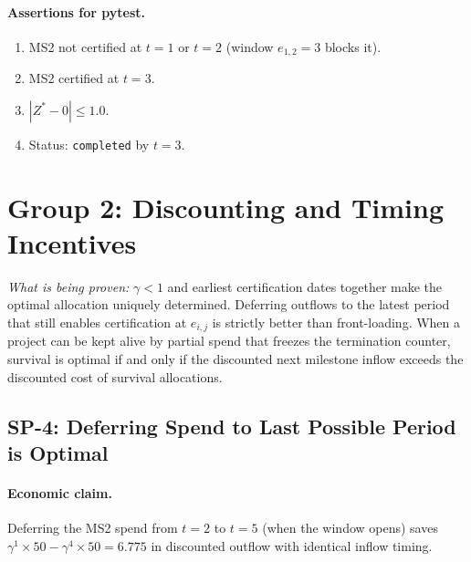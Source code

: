 \paragraph{Assertions for pytest.}
\begin{enumerate}[label=A\arabic*.]
  \item MS2 not certified at $t=1$ or $t=2$ (window $e_{1,2}=3$ blocks it).
  \item MS2 certified at $t=3$.
  \item $|Z^*-0|\leq1.0$.
  \item Status: \texttt{completed} by $t=3$.
\end{enumerate}

\section{Group 2: Discounting and Timing Incentives}

\textit{What is being proven:} $\gamma<1$ and earliest certification dates
together make the optimal allocation uniquely determined. Deferring
outflows to the latest period that still enables certification at
$e_{i,j}$ is strictly better than front-loading. When a project can
be kept alive by partial spend that freezes the termination counter,
survival is optimal if and only if the discounted next milestone inflow
exceeds the discounted cost of survival allocations.

\subsection{SP-4: Deferring Spend to Last Possible Period is Optimal}

\paragraph{Economic claim.}
Deferring the MS2 spend from $t=2$ to $t=5$ (when the window opens)
saves $\gamma^1\times50-\gamma^4\times50=6.775$ in discounted outflow
with identical inflow timing.

